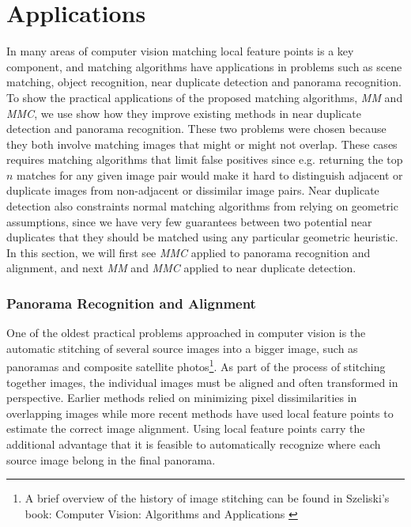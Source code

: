 \chapter{Applications}
\label{C:Applications}

In many areas of computer vision matching local feature points is a key 
component, and matching algorithms have applications in problems such as
scene matching, object recognition, near duplicate detection and 
panorama recognition. To show the practical applications of the proposed 
matching algorithms, \emph{MM} and \emph{MMC}, we use show how they 
improve existing methods in near duplicate detection and panorama 
recognition. These two problems were chosen because they both involve 
matching images that might or might not overlap. These cases requires 
matching algorithms that limit false positives since e.g. returning the 
top $n$ matches for any given image pair would make it hard to 
distinguish adjacent or duplicate images from non-adjacent or dissimilar
image pairs. Near duplicate detection also constraints normal matching 
algorithms from relying on geometric assumptions, since we have very few
guarantees between two potential near duplicates that they should be 
matched using any particular geometric heuristic. In this section, we 
will first see \emph{MMC} applied to panorama recognition and alignment,
and next \emph{MM} and \emph{MMC} applied to near duplicate detection.


\subsection{Panorama Recognition and Alignment}
One of the oldest practical problems approached in computer vision is 
the automatic stitching of several source images into a bigger image, 
such as panoramas and composite satellite photos\footnote{A brief 
overview of the history of image stitching can be found in Szeliski's 
book: Computer Vision: Algorithms and Applications \cite{szeliski2010}}.  
As part of the process of stitching together images, the individual 
images must be aligned and often transformed in perspective. Earlier 
methods relied on minimizing pixel dissimilarities in overlapping images 
while more recent methods have used local feature points to estimate the 
correct image alignment. Using local feature points carry the additional 
advantage that it is feasible to automatically recognize where each 
source image belong in the final panorama.

